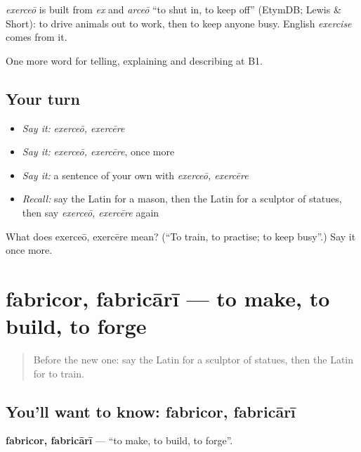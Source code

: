\begin{cousinweb}
\emph{exerceō} is built from \emph{ex} and \emph{arceō} \textquotedblleft{}to shut in, to keep off\textquotedblright{} (EtymDB; Lewis \& Short): to drive animals out to work, then to keep anyone busy. English \emph{exercise} comes from it.
\end{cousinweb}

\begin{grammarlens}[title={What you've built}]
One more word for telling, explaining and describing at B1.
\end{grammarlens}

\subsection*{Your turn}
\begin{itemize}
\raggedright
  \item \emph{Say it:} \emph{exerceō, exercēre}
  \item \emph{Say it:} \emph{exerceō, exercēre}, once more
  \item \emph{Say it:} a sentence of your own with \emph{exerceō, exercēre}
  \item \emph{Recall:} say the Latin for a mason, then the Latin for a sculptor of statues, then say \emph{exerceō, exercēre} again
\end{itemize}

\begin{tcolorbox}[breakable,colback=teal!4,colframe=teal!35!black,title={Before you move on}]
What does exerceō, exercēre mean? (\textquotedblleft{}To train, to practise; to keep busy\textquotedblright{}.) Say it once more.
\end{tcolorbox}
\section[fabricor, fabricārī]{fabricor, fabricārī — to make, to build, to forge}

\label{lesson:LA-C378-fabricor}



\begin{quote}
Before the new one: say the Latin for a sculptor of statues, then the Latin for to train.
\end{quote}

\subsection*{You'll want to know: fabricor, fabricārī}
\textbf{fabricor, fabricārī} — \textquotedblleft{}to make, to build, to forge\textquotedblright{}.

